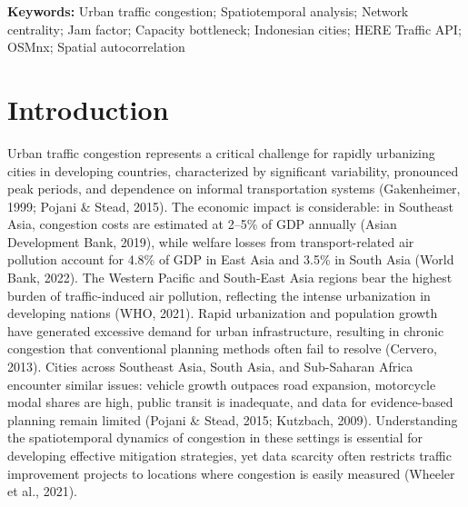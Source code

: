 \documentclass[12pt,a4paper]{article}
\begin{document}
\noindent\textbf{Keywords:} Urban traffic congestion; Spatiotemporal analysis; Network centrality; Jam factor; Capacity bottleneck; Indonesian cities; HERE Traffic API; OSMnx; Spatial autocorrelation

\newpage

\section{Introduction}

Urban traffic congestion represents a critical challenge for rapidly urbanizing cities in developing countries, characterized by significant variability, pronounced peak periods, and dependence on informal transportation systems (Gakenheimer, 1999; Pojani \& Stead, 2015). The economic impact is considerable: in Southeast Asia, congestion costs are estimated at 2--5\% of GDP annually (Asian Development Bank, 2019), while welfare losses from transport-related air pollution account for 4.8\% of GDP in East Asia and 3.5\% in South Asia (World Bank, 2022). The Western Pacific and South-East Asia regions bear the highest burden of traffic-induced air pollution, reflecting the intense urbanization in developing nations (WHO, 2021). Rapid urbanization and population growth have generated excessive demand for urban infrastructure, resulting in chronic congestion that conventional planning methods often fail to resolve (Cervero, 2013). Cities across Southeast Asia, South Asia, and Sub-Saharan Africa encounter similar issues: vehicle growth outpaces road expansion, motorcycle modal shares are high, public transit is inadequate, and data for evidence-based planning remain limited (Pojani \& Stead, 2015; Kutzbach, 2009). Understanding the spatiotemporal dynamics of congestion in these settings is essential for developing effective mitigation strategies, yet data scarcity often restricts traffic improvement projects to locations where congestion is easily measured (Wheeler et al., 2021).
\end{document}
